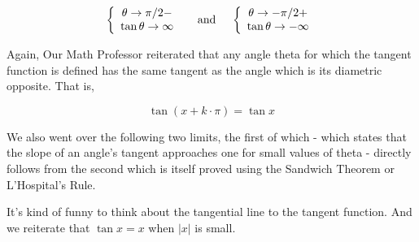 \documentclass{article}
\begin{document}
\[\left\{\begin{array}{cc}\theta\to\pi/2-\\\tan\theta\to\infty\end{array}\right.\quad\textnormal{ and }\quad\left\{\begin{array}{cc}\theta\to-\pi/2+\\\tan\theta\to-\infty\end{array}\right.\]

Again, Our Math Professor reiterated that any angle theta for which the tangent function is defined has the same tangent as the angle which is its diametric opposite. That is,

\[\tan(x+k\cdot\pi)=\tan x\]

\vspace{10pt}

We also went over the following two limits, the first of which - which states that the slope of an angle's tangent approaches one for small values of theta - directly follows from the second which is itself proved using the Sandwich Theorem or L'Hospital's Rule.

\vspace{10pt}

\begin{center}
\end{center}

\vspace{10pt}

It's kind of funny to think about the tangential line to the tangent function. And we reiterate that $\tan x=x$ when $|x|$ is small.

\vspace{10pt}

\begin{center}
\end{center}
\end{document}
